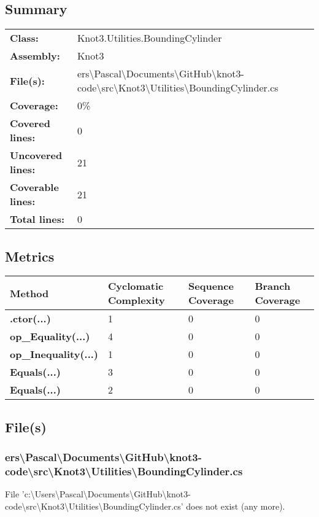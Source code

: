 \documentclass[a4paper,10pt]{article}
\begin{document}
\subsection{Summary}
\begin{longtable}[l]{ll}
\textbf{Class:} & Knot3.Utilities.BoundingCylinder\\
\textbf{Assembly:} & Knot3\\
\textbf{File(s):} & \begin{minipage}[t]{12cm}{ers\textbackslash Pascal\textbackslash Documents\textbackslash GitHub\textbackslash knot3-code\textbackslash src\textbackslash Knot3\textbackslash Utilities\textbackslash BoundingCylinder.cs}\end{minipage} \\
\textbf{Coverage:} & 0\%\\
\textbf{Covered lines:} & 0\\
\textbf{Uncovered lines:} & 21\\
\textbf{Coverable lines:} & 21\\
\textbf{Total lines:} & 0\\
\end{longtable}
\subsection{Metrics}
\begin{longtable}[l]{|l|l|l|l|}
\hline
\textbf{Method} & \textbf{Cyclomatic Complexity} & \textbf{Sequence Coverage} & \textbf{Branch Coverage}\\
\hline
\textbf{.ctor(...)} & 1 & 0 & 0\\
\hline
\textbf{op\_Equality(...)} & 4 & 0 & 0\\
\hline
\textbf{op\_Inequality(...)} & 1 & 0 & 0\\
\hline
\textbf{Equals(...)} & 3 & 0 & 0\\
\hline
\textbf{Equals(...)} & 2 & 0 & 0\\
\hline
\end{longtable}
\subsection{File(s)}
\subsubsection{ers\textbackslash Pascal\textbackslash Documents\textbackslash GitHub\textbackslash knot3-code\textbackslash src\textbackslash Knot3\textbackslash Utilities\textbackslash BoundingCylinder.cs}
 File 'c:\textbackslash Users\textbackslash Pascal\textbackslash Documents\textbackslash GitHub\textbackslash knot3-code\textbackslash src\textbackslash Knot3\textbackslash Utilities\textbackslash BoundingCylinder.cs' does not exist (any more).
\newpage
\end{document}
